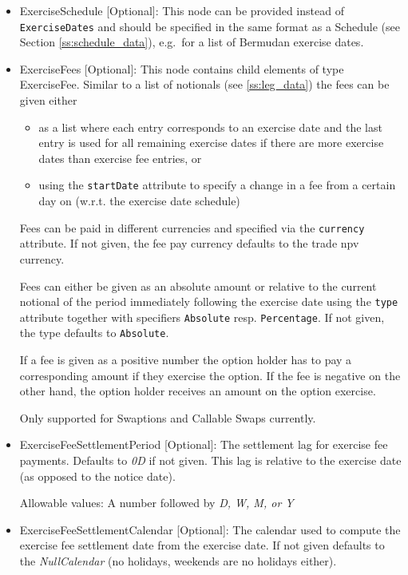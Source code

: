 \begin{itemize}
\item ExerciseSchedule [Optional]: This node can be provided instead of \lstinline!ExerciseDates! and
should be specified in the same format as a Schedule (see Section \ref{ss:schedule_data}), e.g.\ for
a list of Bermudan exercise dates.

\item ExerciseFees [Optional]: This node contains child elements of type ExerciseFee. Similar to a list of notionals
  (see \ref{ss:leg_data}) the fees can be given either

  \begin{itemize}
  \item as a list where each entry corresponds to an exercise date and the last entry is used for all remaining exercise
    dates if there are more exercise dates than exercise fee entries, or
  \item using the \verb+startDate+ attribute to specify a change in a fee from a certain day on (w.r.t. the exercise
    date schedule)
  \end{itemize}

  Fees can be paid in different currencies and specified via the \verb+currency+ attribute. If not given, the fee pay
  currency defaults to the trade npv currency.

  Fees can either be given as an absolute amount or relative to the current notional of the period immediately following
  the exercise date using the \verb+type+ attribute together with specifiers \verb+Absolute+ resp. \verb+Percentage+. If
  not given, the type defaults to \verb+Absolute+.

  If a fee is given as a positive number the option holder has to pay a corresponding amount if they exercise the
  option. If the fee is negative on the other hand, the option holder receives an amount on the option exercise.

  Only supported for Swaptions and Callable Swaps currently.

\item ExerciseFeeSettlementPeriod [Optional]: The settlement lag for exercise fee payments. Defaults to \emph{0D} if not
  given. This lag is relative to the exercise date (as opposed to the notice date).

  Allowable values: A number followed by \emph{D, W, M, or Y}

\item ExerciseFeeSettlementCalendar [Optional]: The calendar used to compute the exercise fee settlement date from the
  exercise date. If not given defaults to the  \emph{NullCalendar} (no holidays, weekends are no holidays either).


\end{itemize}
